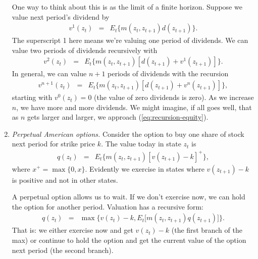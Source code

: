 \documentclass[11pt]{article}
\begin{document}
\begin{enumerate}
One way to think about this is as the limit of a finite horizon.
Suppose we value next period's dividend by
\begin{eqnarray*}
    v^1(z_t) &=& E_t \big\{ m(z_t,z_{t+1}) d(z_{t+1}) \big\} .
\end{eqnarray*}
The superscript 1 here means we're valuing one period of dividends.
We can value two periods of dividends recursively with
\begin{eqnarray*}
    v^2(z_t) &=& E_t \big\{ m(z_t,z_{t+1}) [d(z_{t+1}) + v^1(z_{t+1})] \big\} .
\end{eqnarray*}
In general, we can value $n+1$ periods of dividends with the recursion
\begin{eqnarray*}
    v^{n+1}(z_t) &=& E_t \big\{ m(z_t,z_{t+1}) [d(z_{t+1}) + v^n(z_{t+1})] \big\} ,
    \label{eq:recursion-equity-n}
\end{eqnarray*}
starting with $v^0(z_t) = 0$ (the value of zero dividends is zero).
As we increase $n$, we have more and more dividends.
We might imagine, if all goes well, that as $n$ gets larger and larger,
we approach (\ref{eq:recursion-equity}).

\begin{comment}
Unlike bond pricing, loglinear examples don't work.
There are some popular loglinear approximations, but that's too much work for now.
We can, however, adapt the Markov chain setup we used with bonds.
Suppose the dividend is a vector $d$, with one element for each state.
Then the pricing relation (\ref{eq:recursion-equity}) becomes
\begin{eqnarray*}
    v &=& B (d+v) .
\end{eqnarray*}
The solution is $ v = (I-B)^{-1} B d$.
Alternatively, we can substitute repeatedly to get
$ v = B d + B^2 d + B^3 d + \cdots $,
the present discounted value version of the equity price.
\end{comment}

\item {\it Perpetual American options.\/}
Consider the option to buy one share of stock next period for strike price $k$.
The value today in state $z_t$ is
\begin{eqnarray*}
    q(z_t) &=& E_t \big\{ m(z_t,z_{t+1}) [v(z_{t+1}) - k]^+ \big\} ,
\end{eqnarray*}
where $x^+ = \max \{0, x \} $.
Evidently we exercise in states where $ v(z_{t+1}) - k$ is positive
and not in other states.

A perpetual option allows us to wait.
If we don't exercise now, 
we can hold the option for another period.
Valuation has a recursive form:
\begin{eqnarray*}
    q(z_t) &=& \max \big\{ v(z_{t}) - k, E_t \big[ m(z_t,z_{t+1}) q(z_{t+1})\big] \big\} .
\end{eqnarray*}
That is:  we either exercise now and get $v(z_t)-k$ (the first branch
of the max) or continue to hold the option and get the current value of the option
next period (the second branch).


\end{enumerate}
\end{document}
